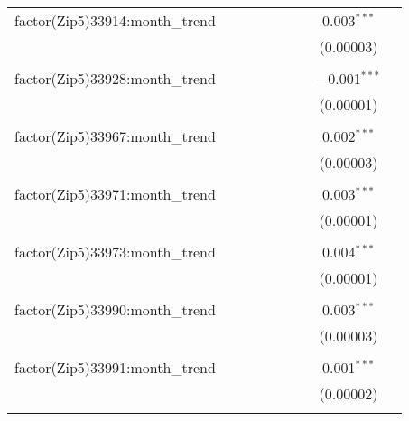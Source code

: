 \begin{table}[H]
{\begin{tabular}{@{\extracolsep{5pt}}lcccccccc}
  factor(Zip5)33914:month\_trend &  &  &  &  &  &  & 0.003$^{***}$ &  \\  

   &  &  &  &  &  &  & (0.00003) &  \\  

   & & & & & & & & \\  

  factor(Zip5)33928:month\_trend &  &  &  &  &  &  & $-$0.001$^{***}$ &  \\  

   &  &  &  &  &  &  & (0.00001) &  \\  

   & & & & & & & & \\  

  factor(Zip5)33967:month\_trend &  &  &  &  &  &  & 0.002$^{***}$ &  \\  

   &  &  &  &  &  &  & (0.00003) &  \\  

   & & & & & & & & \\  

  factor(Zip5)33971:month\_trend &  &  &  &  &  &  & 0.003$^{***}$ &  \\  

   &  &  &  &  &  &  & (0.00001) &  \\  

   & & & & & & & & \\  

  factor(Zip5)33973:month\_trend &  &  &  &  &  &  & 0.004$^{***}$ &  \\  

   &  &  &  &  &  &  & (0.00001) &  \\  

   & & & & & & & & \\  

  factor(Zip5)33990:month\_trend &  &  &  &  &  &  & 0.003$^{***}$ &  \\  

   &  &  &  &  &  &  & (0.00003) &  \\  

   & & & & & & & & \\  

  factor(Zip5)33991:month\_trend &  &  &  &  &  &  & 0.001$^{***}$ &  \\  

   &  &  &  &  &  &  & (0.00002) &  \\  

   & & & & & & & & \\  


\end{tabular}}
\end{table}
